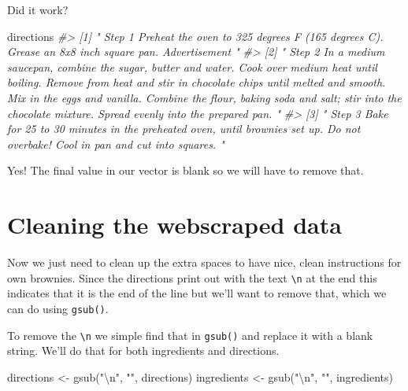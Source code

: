 \documentclass[
  12pt,
  openany]{book}
\newenvironment{Shaded}{\begin{snugshade}}{\end{snugshade}}
\newcommand{\CommentTok}[1]{\textcolor[rgb]{0.37,0.37,0.37}{\textit{#1}}}
\newcommand{\FunctionTok}[1]{\textcolor[rgb]{0,0,0}{#1}}
\newcommand{\NormalTok}[1]{#1}
\newcommand{\OtherTok}[1]{\textcolor[rgb]{0.37,0.37,0.37}{#1}}
\newcommand{\SpecialCharTok}[1]{\textcolor[rgb]{0,0,0}{#1}}
\newcommand{\StringTok}[1]{\textcolor[rgb]{0.5,0.5,0.5}{#1}}
\begin{document}
Did it work?

\begin{Shaded}
\begin{Highlighting}[]
\NormalTok{directions}
\CommentTok{\#\textgreater{} [1] "   Step 1   Preheat the oven to 325 degrees F (165 degrees C). Grease an 8x8 inch square pan.    Advertisement "                                                                                                                                                                                                                 }
\CommentTok{\#\textgreater{} [2] "   Step 2   In a medium saucepan, combine the sugar, butter and water. Cook over medium heat until boiling. Remove from heat and stir in chocolate chips until melted and smooth. Mix in the eggs and vanilla. Combine the flour, baking soda and salt; stir into the chocolate mixture. Spread evenly into the prepared pan.   "}
\CommentTok{\#\textgreater{} [3] "   Step 3   Bake for 25 to 30 minutes in the preheated oven, until brownies set up. Do not overbake! Cool in pan and cut into squares.   "}
\end{Highlighting}
\end{Shaded}

Yes! The final value in our vector is blank so we will have to remove that.

\hypertarget{cleaning-the-webscraped-data}{%
\section{Cleaning the webscraped data}\label{cleaning-the-webscraped-data}}

Now we just need to clean up the extra spaces to have nice, clean instructions for own brownies. Since the directions print out with the text \texttt{\textbackslash{}n} at the end this indicates that it is the end of the line but we'll want to remove that, which we can do using \texttt{gsub()}.

To remove the \texttt{\textbackslash{}n} we simple find that in \texttt{gsub()} and replace it with a blank string. We'll do that for both ingredients and directions.

\begin{Shaded}
\begin{Highlighting}[]
\NormalTok{directions }\OtherTok{\textless{}{-}} \FunctionTok{gsub}\NormalTok{(}\StringTok{"}\SpecialCharTok{\textbackslash{}n}\StringTok{"}\NormalTok{, }\StringTok{""}\NormalTok{, directions)}
\NormalTok{ingredients }\OtherTok{\textless{}{-}} \FunctionTok{gsub}\NormalTok{(}\StringTok{"}\SpecialCharTok{\textbackslash{}n}\StringTok{"}\NormalTok{, }\StringTok{""}\NormalTok{, ingredients)}
\end{Highlighting}
\end{Shaded}
\end{document}

